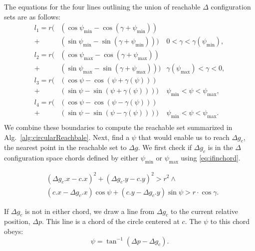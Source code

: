 The equations for the four lines outlining the union of reachable $\Delta$ configuration sets are as follows:
\begin{align}\label{eq:circlereachable}
l_1 =  r \Big(&(\cos\psi_{\min}- \cos(\gamma + \psi_{\min}) )\\ \nonumber
 + &(\sin\psi_{\min}- \sin(\gamma + \psi_{\min}))\Big) &  0<\gamma< \gamma(\psi_{\min}),\\ \nonumber
l_2 =  r \Big(&(\cos\psi_{\max}- \cos(\gamma + \psi_{\max}))\\ \nonumber
 + &(\sin\psi_{\max}- \sin(\gamma + \psi_{\max}))\Big) &  \gamma(\psi_{\max})<\gamma< 0,\\  \nonumber
l_3 =  r \Big(&(\cos\psi- \cos( \psi+\gamma(\psi) ) )\\ \nonumber
+ &( \sin\psi-\sin( \psi+ \gamma(\psi)))\Big) &  \psi_{\min}<\psi< \psi_{\max},\\ \nonumber
l_4 =  r \Big(&(\cos\psi- \cos( \psi-\gamma(\psi) ))\\ \nonumber
+ & ( \sin\psi- \sin( \psi- \gamma(\psi)))\Big) &  \psi_{\min}<\psi< \psi_{\max}.\\ \nonumber
\end{align}
We combine these boundaries to compute the reachable set summarized in Alg.~\ref{alg:circularReachbale}.
Next, find a $\psi$ that would enable us to reach $\Delta g_c$, the nearest point in the reachable set to $\Delta g$. %
We first check if $\Delta g_c$ is in the $\Delta$ configuration space chords defined by either $\psi_{\min}$ or $\psi_{\max}$ using \ref{eq:ifinchord}. 

\begin{align}\label{eq:ifinchord}
&(\Delta g_c.x - c.x)^2 + (\Delta g_c.y - c.y)^2  > r^2 \wedge\\ \nonumber
 &( c.x-\Delta g_c.x ) \cos\psi + ( c.y-\Delta g_c.y) \sin\psi > r\cdot \cos\gamma.
\end{align}

 If $\Delta g_c$ is not in either chord, we draw a line from $\Delta g_c$ to the current relative position, $\Delta p$. This line is a chord of the circle centered at $c$. The $\psi$ to this chord obeys:
  \begin{equation}
 \psi = \tan^{-1}(\Delta p - \Delta g_c ).
 \end{equation}
 
